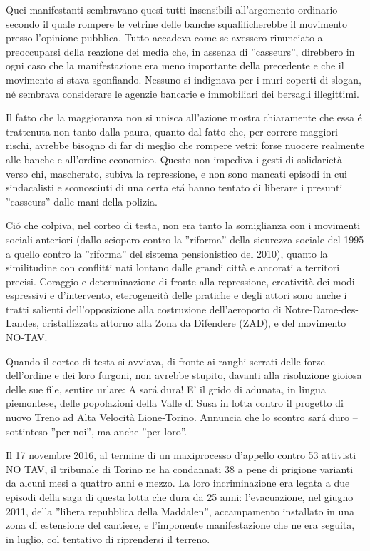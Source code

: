 Quei manifestanti sembravano quesi tutti insensibili all’argomento ordinario secondo il quale rompere le vetrine delle banche squalificherebbe il movimento presso l’opinione pubblica. Tutto accadeva come se avessero rinunciato a preoccuparsi della reazione dei media che, in assenza di ''casseurs'', direbbero in ogni caso che la manifestazione era meno importante della precedente e che il movimento si stava sgonfiando. Nessuno si indignava per i muri coperti di slogan, n\'e sembrava considerare le agenzie bancarie e immobiliari dei bersagli illegittimi.

Il fatto che la maggioranza non si unisca all’azione mostra chiaramente che essa \'e trattenuta non tanto dalla paura, quanto dal fatto che, per correre maggiori rischi, avrebbe bisogno di far di meglio che rompere vetri: forse nuocere realmente alle banche e all’ordine economico. Questo non impediva i gesti di solidarietà verso chi, mascherato, subiva la repressione, e non sono mancati episodi in cui sindacalisti e sconosciuti di una certa et\'a hanno tentato di liberare i presunti ''casseurs'' dalle mani della polizia.

Ci\'o che colpiva, nel corteo di testa, non era tanto la somiglianza con i movimenti sociali anteriori (dallo sciopero contro la ''riforma'' della sicurezza sociale del 1995 a quello contro la ''riforma'' del sistema pensionistico del 2010), quanto la similitudine con conflitti nati lontano dalle grandi città e ancorati a territori precisi. Coraggio e determinazione di fronte alla repressione, creatività dei modi espressivi e d’intervento, eterogeneità delle pratiche e degli attori sono anche i tratti salienti dell’opposizione alla costruzione dell’aeroporto di Notre-Dame-des-Landes, cristallizzata attorno alla Zona da Difendere (ZAD), e del movimento NO-TAV.

Quando il corteo di testa si avviava, di fronte ai ranghi serrati delle forze dell’ordine e dei loro furgoni, non avrebbe stupito, davanti alla risoluzione gioiosa delle sue file, sentire urlare: A sar\'a d\:ura! E’ il grido di adunata, in lingua piemontese, delle popolazioni della Valle di Susa in lotta contro il progetto di nuovo Treno ad Alta Velocità Lione-Torino. Annuncia che lo scontro sar\'a duro – sottinteso ''per noi'', ma anche ''per loro''.

Il 17 novembre 2016, al termine di un maxiprocesso d’appello contro 53 attivisti NO TAV, il tribunale di Torino ne ha condannati 38 a pene di prigione varianti da alcuni mesi a quattro anni e mezzo. La loro incriminazione era legata a due episodi della saga di questa lotta che dura da 25 anni: l’evacuazione, nel giugno 2011, della ''libera repubblica della Maddalen'', accampamento installato in una zona di estensione del cantiere, e l’imponente manifestazione che ne era seguita, in luglio, col tentativo di riprendersi il terreno.

